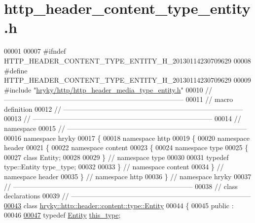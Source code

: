 \hypertarget{http__header__content__type__entity_8h_source}{\section{http\-\_\-header\-\_\-content\-\_\-type\-\_\-entity.\-h}
}

\begin{DoxyCode}
00001 
00007 \textcolor{preprocessor}{#ifndef HTTP\_HEADER\_CONTENT\_TYPE\_ENTITY\_H\_20130114230709629}
00008 \textcolor{preprocessor}{}\textcolor{preprocessor}{#define HTTP\_HEADER\_CONTENT\_TYPE\_ENTITY\_H\_20130114230709629}
00009 \textcolor{preprocessor}{}\textcolor{preprocessor}{#include "\hyperlink{http__header__media__type__entity_8h}{hryky/http/http_header_media_type_entity.h}"}
00010 \textcolor{comment}{//
      ------------------------------------------------------------------------------}
00011 \textcolor{comment}{// macro definition}
00012 \textcolor{comment}{//
      ------------------------------------------------------------------------------}
00013 \textcolor{comment}{//
      ------------------------------------------------------------------------------}
00014 \textcolor{comment}{// namespace}
00015 \textcolor{comment}{//
      ------------------------------------------------------------------------------}
00016 \textcolor{keyword}{namespace }hryky
00017 \{
00018 \textcolor{keyword}{namespace }http
00019 \{
00020 \textcolor{keyword}{namespace }header
00021 \{
00022 \textcolor{keyword}{namespace }content
00023 \{
00024 \textcolor{keyword}{namespace }type
00025 \{
00027     \textcolor{keyword}{class }Entity;
00028 
00029 \} \textcolor{comment}{// namespace type}
00030 
00031 \textcolor{keyword}{typedef} type::Entity type\_type;
00032 
00033 \} \textcolor{comment}{// namespace content}
00034 \} \textcolor{comment}{// namespace header}
00035 \} \textcolor{comment}{// namespace http}
00036 \} \textcolor{comment}{// namespace hryky}
00037 \textcolor{comment}{//
      ------------------------------------------------------------------------------}
00038 \textcolor{comment}{// class declarations}
00039 \textcolor{comment}{//
      ------------------------------------------------------------------------------}
\hypertarget{http__header__content__type__entity_8h_source_l00043}{}\hyperlink{classhryky_1_1http_1_1header_1_1content_1_1type_1_1_entity}{00043} \textcolor{comment}{}\textcolor{keyword}{class }\hyperlink{classhryky_1_1http_1_1header_1_1content_1_1type_1_1_entity}{hryky::http::header::content::type::Entity}
00044 \{
00045 \textcolor{keyword}{public} :
00046 
\hypertarget{http__header__content__type__entity_8h_source_l00047}{}\hyperlink{classhryky_1_1http_1_1header_1_1content_1_1type_1_1_entity_aa4a0bbf1621298929fe4e74debe982b4}{00047}     \textcolor{keyword}{typedef} \hyperlink{classhryky_1_1http_1_1header_1_1content_1_1type_1_1_entity}{Entity} \hyperlink{classhryky_1_1http_1_1header_1_1content_1_1type_1_1_entity_aa4a0bbf1621298929fe4e74debe982b4}{this_type};

\end{DoxyCode}
